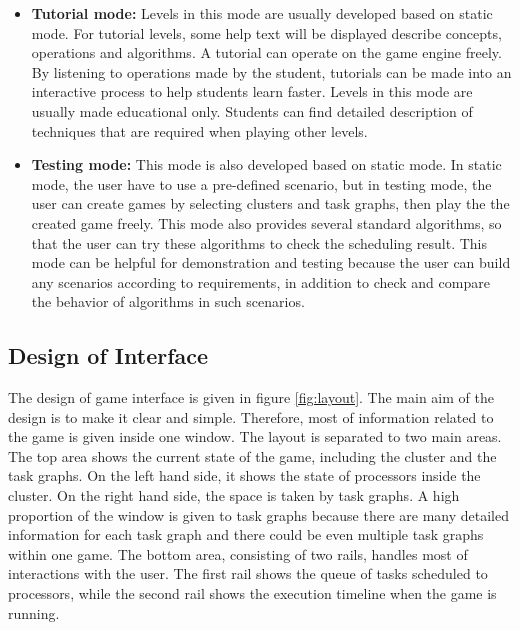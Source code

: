 \documentclass[msc,deptreport, cs]{infthesis}
\begin{document}
\begin{itemize}
  \item \textbf{Tutorial mode:} Levels in this mode are usually developed based on static mode. For tutorial levels, some help text will be displayed describe concepts, operations and algorithms. A tutorial can operate on the game engine freely. By listening to operations made by the student, tutorials can be made into an interactive process to help students learn faster. Levels in this mode are usually made educational only. Students can find detailed description of techniques that are required when playing other levels.

  \item \textbf{Testing mode:} This mode is also developed based on static mode. In static mode, the user have to use a pre-defined scenario, but in testing mode, the user can create games by selecting clusters and task graphs, then play the the created game freely. This mode also provides several standard algorithms, so that the user can try these algorithms to check the scheduling result. This mode can be helpful for demonstration and testing because the user can build any scenarios according to requirements, in addition to check and compare the behavior of algorithms in such scenarios.
\end{itemize}

\subsection{Design of Interface} \label{sec:interface}

The design of game interface is given in figure \ref{fig:layout}. The main aim of the design is to make it clear and simple. Therefore, most of information related to the game is given inside one window. The layout is separated to two main areas. The top area shows the current state of the game, including the cluster and the task graphs. On the left hand side, it shows the state of processors inside the cluster. On the right hand side, the space is taken by task graphs. A high proportion of the window is given to task graphs because there are many detailed information for each task graph and there could be even multiple task graphs within one game. The bottom area, consisting of two rails, handles most of interactions with the user. The first rail shows the queue of tasks scheduled to processors, while the second rail shows the execution timeline when the game is running.
\end{document}
